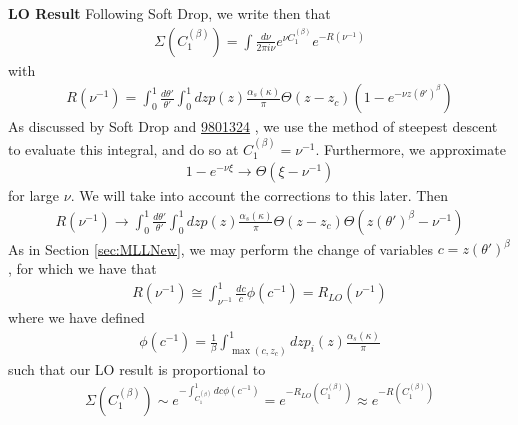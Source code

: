 \textbf{LO Result}
Following Soft Drop, we write then that
\begin{align}
    \Sigma(C_1^{(\beta)}) = \int \frac{d\nu}{2\pi i\nu} e^{\nu C_1^{(\beta)}} e^{-R(\nu^{-1})}
\end{align}
with
\begin{align}
    R(\nu^{-1}) = \int_0^1\frac{d\theta'}{\theta'}\int_0^1 dz p(z) \frac{\alpha_s(\kappa)}{\pi}\Theta(z-z_c)\left(1 - e^{-\nu z (\theta')^\beta} \right)
\end{align}
As discussed by Soft Drop and \href{https://arxiv.org/pdf/hep-ph/9801324.pdf}{9801324} , we use the method of steepest descent to evaluate this integral, and do so at \(C_1^{(\beta)} = \nu^{-1}\). Furthermore, we approximate
\begin{align}
    1 - e^{-\nu \xi} \to \Theta(\xi - \nu^{-1})
\end{align}
for large \(\nu\). We will take into account the corrections to this later. Then
\begin{align}
    R(\nu^{-1}) \to \int_0^1\frac{d\theta'}{\theta'}\int_0^1 dz p(z) \frac{\alpha_s(\kappa)}{\pi}\Theta(z-z_c) \Theta(z (\theta')^\beta - \nu^{-1})
\end{align}
As in Section \ref{sec:MLLNew}, we may perform the change of variables \(c = z(\theta')^{\beta}\), for which we have that
\begin{align}
    R(\nu^{-1}) \cong \int_{\nu^{-1}}^1 \frac{dc}{c} \phi(c^{-1}) = R_{LO}(\nu^{-1})
\end{align}
where we have defined
\begin{align}
    \phi(c^{-1}) = \frac{1}{\beta}\int_{\max(c, z_c)}^1 dz p_i(z) \frac{\alpha_s(\kappa)}{\pi}
\end{align}
such that our LO result is proportional to
\begin{align}
    \Sigma(C_1^{(\beta)}) \sim e^{- \int_{C_1^{(\beta)}}^1 dc \phi(c^{-1})} = e^{-R_{LO}(C_1^{(\beta)})} \approx e^{-R(C_1^{(\beta)})}
\end{align}

